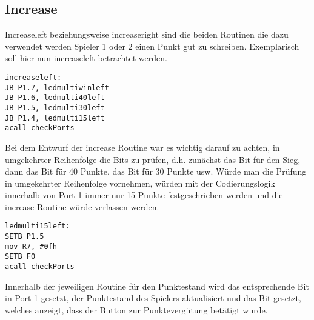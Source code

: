 \subsection{Increase}
Increaseleft beziehungsweise increaseright sind die beiden Routinen die dazu verwendet werden Spieler 1 oder 2 einen Punkt gut zu schreiben. Exemplarisch soll hier nun increaseleft betrachtet werden.
\begin{lstlisting}
increaseleft:
JB P1.7, ledmultiwinleft
JB P1.6, ledmulti40left
JB P1.5, ledmulti30left
JB P1.4, ledmulti15left
acall checkPorts
\end{lstlisting}
Bei dem Entwurf der increase Routine war es wichtig darauf zu achten, in umgekehrter Reihenfolge die Bits zu prüfen, d.h. zunächst das Bit für den Sieg, dann das Bit für 40 Punkte, das Bit für 30 Punkte usw. Würde man die Prüfung in umgekehrter Reihenfolge vornehmen, würden mit der Codierungslogik innerhalb von Port 1 immer nur 15 Punkte festgeschrieben werden und die increase Routine würde verlassen werden. 
\begin{lstlisting}
ledmulti15left:
SETB P1.5
mov R7, #0fh
SETB F0
acall checkPorts
\end{lstlisting}
Innerhalb der jeweiligen Routine für den Punktestand wird das entsprechende Bit in Port 1 gesetzt, der Punktestand des Spielers aktualisiert und das Bit gesetzt, welches anzeigt, dass der Button zur Punktevergütung betätigt wurde. 
